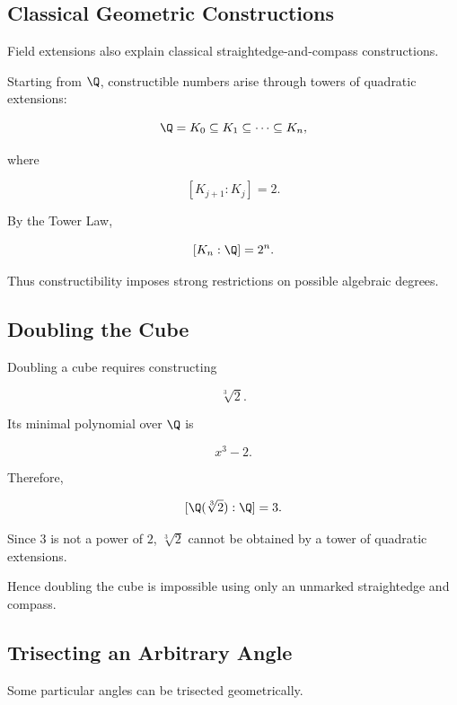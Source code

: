 \subsection{Classical Geometric Constructions}
\label{subsec:galois-geometric-constructions}

Field extensions also explain classical straightedge-and-compass
constructions.

Starting from \(\Q\), constructible numbers arise through towers of quadratic
extensions:

\[ \Q=K_0\subseteq K_1\subseteq\cdots\subseteq K_n, \]

where

\[ [K_{j+1}:K_j]=2. \]

By the Tower Law,

\[ [K_n:\Q]=2^n. \]

Thus constructibility imposes strong restrictions on possible algebraic
degrees.

\subsection{Doubling the Cube}
\label{subsec:doubling-cube}

Doubling a cube requires constructing

\[ \sqrt[3]{2}. \]

Its minimal polynomial over \(\Q\) is

\[ x^3-2. \]

Therefore,

\[ [\Q(\sqrt[3]{2}):\Q]=3. \]

Since \(3\) is not a power of \(2\), \(\sqrt[3]{2}\) cannot be obtained by a
tower of quadratic extensions.

Hence doubling the cube is impossible using only an unmarked straightedge
and compass.

\subsection{Trisecting an Arbitrary Angle}
\label{subsec:angle-trisection-galois}

Some particular angles can be trisected geometrically.

